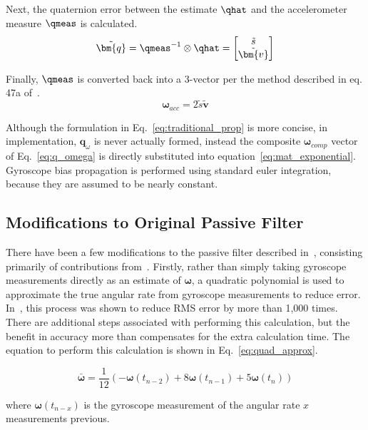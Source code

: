 \documentclass[paper=a4, fontsize=11pt]{scrartcl} %
\numberwithin{equation}{section} %
\numberwithin{figure}{section} %
\numberwithin{table}{section} %
\begin{document}
\newcommand{\qtilde}{\tilde{\bm{q}}}
\newcommand{\vtilde}{\tilde{\bm{v}}}
Next, the quaternion error between the estimate $\qhat$ and the accelerometer measure $\qmeas$ is calculated.
\begin{equation}
	\qtilde = \qmeas^{-1} \otimes \qhat = 
		\begin{bmatrix}
			\tilde{s}\\
			\vtilde
		\end{bmatrix}
\end{equation}

\newcommand{\wmeas}{\bm{\omega}_{acc}}
Finally, $\qmeas$ is converted back into a 3-vector per the method described in eq. 47a of~\cite{Mahony2007}.
\begin{equation}
	\wmeas = 2\tilde{s}\vtilde
\end{equation}

Although the formulation in Eq.~\ref{eq:traditional_prop} is more concise, in implementation, $\bm{q}_{\omega}$ is never actually formed, instead the composite $\bm{\omega}_{comp}$ vector of Eq.~\ref{eq:q_omega} is directly substituted into equation~\ref{eq:mat_exponential}.  Gyroscope bias propagation is performed using standard euler integration, because they are assumed to be nearly constant.

\subsection{Modifications to Original Passive Filter}
There have been a few modifications to the passive filter described in~\cite{Mahony2007}, consisting primarily of contributions from~\cite{Casey2013}.  Firstly, rather than simply taking gyroscope measurements directly as an estimate of $\bm{\omega}$, a quadratic polynomial is used to approximate the true angular rate from gyroscope measurements to reduce error.  In~\cite{Casey2013}, this process was shown to reduce RMS error by more than 1,000 times.  There are additional steps associated with performing this calculation, but the benefit in accuracy more than compensates for the extra calculation time.  The equation to perform this calculation is shown in Eq.~\ref{eq:quad_approx}.

\begin{equation}
	\bar{\bm{\omega}} = \frac{1}{12}\left(-\bm{\omega}\left(t_{n-2}\right) + 8\bm{\omega}\left(t_{n-1}\right) + 5\bm{\omega}\left(t_n\right) \right)
	\label{eq:quad_approx}
\end{equation}

where $\bm{\omega}(t_{n-x})$ is the gyroscope measurement of the angular rate $x$ measurements previous.
\end{document}
